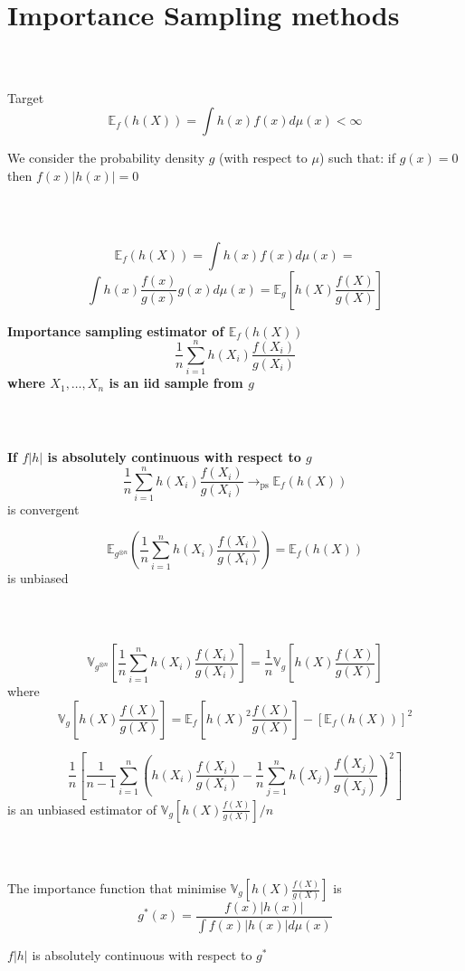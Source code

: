 \documentclass[notes,professionalfont,11pt,usenames,dvipsnames]{beamer}
\newcommand{\ds}{\displaystyle}
\newcommand{\E}{\mathbb{E}}
\newcommand{\V}{\mathbb{V}}
\newcommand\justify{\rightskip0pt \leftskip0pt}
\newenvironment{slide}
{\begin{frame}[environment=slide]
\frametitle{\insertsection \\ \insertsubsection}\justify\setlength{\parskip}{0.5cm}\vspace{-0.5cm}}
{\end{frame}}
\begin{document}
\section{Importance Sampling methods}

\begin{slide}

Target
$$
\E_f(h(X))=\int h(x)f(x)d\mu(x)<\infty
$$


We consider the probability density $g$ (with respect to $\mu$)
such that: if $g(x)=0$ then $f(x)|h(x)|=0$

\end{slide}

\begin{slide}

$$
\E_f(h(X))=\int h(x)f(x)d\mu(x)=
$$
$$
\int h(x)\frac{f(x)}{g(x)}g(x)d\mu(x)=
\E_g\left[h(X)\frac{f(X)}{g(X)}\right]
$$


{\bf Importance sampling estimator of $\E_f(h(X))$
$$
\frac{1}{n}\sum_{i=1}^n h(X_i)\frac{f(X_i)}{g(X_i)}
$$
where $X_1,\ldots,X_n$ is an iid sample from $g$}

\end{slide}

\begin{slide}

\textbf{If $f|h|$ is absolutely continuous with respect to $g$}
$$
\frac{1}{n}\sum_{i=1}^n h(X_i)\frac{f(X_i)}{g(X_i)}\longrightarrow_{\mbox{ps}} \E_f(h(X))
$$
is convergent


$$
\E_{g^{\otimes n}}\left(\frac{1}{n}\sum_{i=1}^n h(X_i)\frac{f(X_i)}{g(X_i)}\right)=\E_f(h(X))
$$
is unbiased

\end{slide}

\begin{slide}

$$
\V_{g^{\otimes n}}\left[\frac{1}{n}\sum_{i=1}^n h(X_i)\frac{f(X_i)}{g(X_i)}\right]=\frac{1}{n}\V_g\left[h(X)\frac{f(X)}{g(X)}\right]
$$
where
$$
\V_g\left[h(X)\frac{f(X)}{g(X)}\right]=\E_f\left[h(X)^2\frac{f(X)}{g(X)}\right]-
\left[\E_f(h(X))\right]^2
$$ 


$$
\frac{1}{n}\left[\frac{1}{n-1}\sum_{i=1}^n\left(h(X_i)\frac{f(X_i)}{g(X_i)}-\frac{1}{n}\sum_{j=1}^nh(X_j)\frac{f(X_j)}{g(X_j)}\right)^2\right]
$$
is an unbiased estimator of $\V_g\left[h(X)\frac{f(X)}{g(X)}\right]\big/ n$

\end{slide}

\begin{slide}

The importance function that minimise $\ds \V_g\left[h(X)\frac{f(X)}{g(X)}\right]$ 
is
$$
g^*(x)=\frac{f(x)|h(x)|}{\int f(x)|h(x)|d\mu(x)}
$$

$f|h|$ is absolutely continuous with respect to $g^*$

\end{slide}
\end{document}
